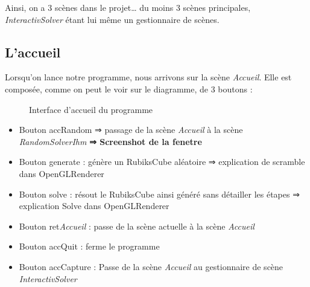 Ainsi, on a 3 scènes dans le projet… du moins 3 scènes principales, \textit{InteractivSolver} étant lui même un gestionnaire de scènes.

\subsection{L'accueil}
Lorsqu’on lance notre programme, nous arrivons sur la scène \textit{Accueil}. Elle est composée, comme on peut le voir sur le diagramme, de 3 boutons :

\begin{figure}[H]
\begin{center}
\end{center}
	\caption{Interface d'accueil du programme}
\end{figure}

\begin{itemize}
    \item Bouton accRandom 
    ⇒ passage de la scène \textit{Accueil} à la scène \textit{RandomSolverIhm}
    \textbf{⇒ Screenshot de la fenetre}

    \item Bouton generate : génère un RubiksCube aléatoire
        ⇒ explication de scramble dans OpenGLRenderer

    \item Bouton solve : résout le RubiksCube ainsi généré sans détailler les étapes
        ⇒ explication Solve dans OpenGLRenderer

    \item Bouton ret\textit{Accueil} : passe de la scène actuelle à la scène \textit{Accueil}

    \item Bouton accQuit : ferme le programme

    \item Bouton accCapture : Passe de la scène \textit{Accueil} au gestionnaire de scène \textit{InteractivSolver}

\end{itemize}

